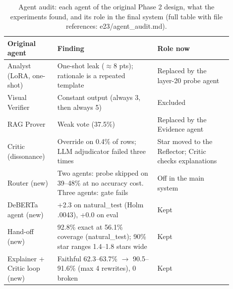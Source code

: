 \begin{table}[htbp]
\centering
\caption{Agent audit: each agent of the original Phase 2 design, what the experiments found, and its role in the final system (full table with file references: e23/agent\_audit.md).}
\label{tab:e23audit}
\small
\begin{tabular}{p{0.2\linewidth}p{0.4\linewidth}p{0.3\linewidth}}
\toprule
\textbf{Original agent} & \textbf{Finding} & \textbf{Role now} \\
\midrule
Analyst (LoRA, one-shot) & One-shot leak ($\approx$8 pts); rationale is a repeated template & Replaced by the layer-20 probe agent \\
Visual Verifier & Constant output (always 3, then always 5) & Excluded \\
RAG Prover & Weak vote (37.5\%) & Replaced by the Evidence agent \\
Critic (dissonance) & Override on 0.4\% of rows; LLM adjudicator failed three times & Star moved to the Reflector; Critic checks explanations \\
Router (new) & Two agents: probe skipped on 39--48\% at no accuracy cost. Three agents: gate fails & Off in the main system \\
DeBERTa agent (new) & +2.3 on natural\_test (Holm .0043), +0.0 on eval & Kept \\
Hand-off (new) & 92.8\% exact at 56.1\% coverage (natural\_test); 90\% star ranges 1.4--1.8 stars wide & Kept \\
Explainer + Critic loop (new) & Faithful 62.3--63.7\% $\to$ 90.5--91.6\% (max 4 rewrites), 0 broken & Kept \\
\bottomrule
\end{tabular}
\end{table}
